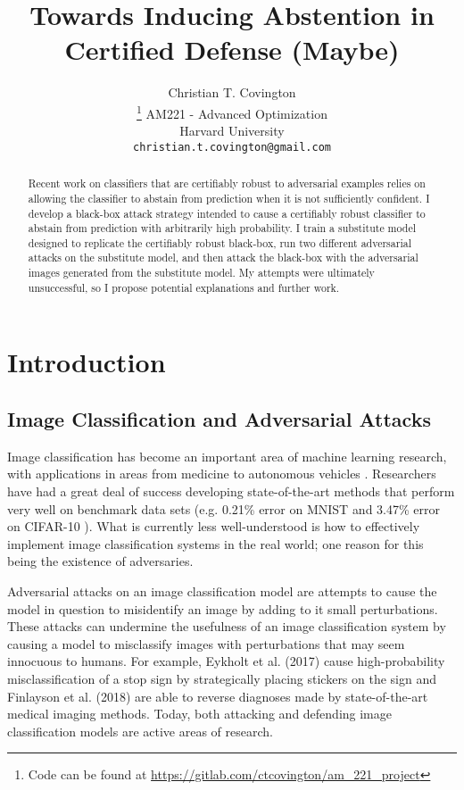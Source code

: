 \documentclass{article}
\title{Towards Inducing Abstention in Certified Defense (Maybe)}
\author{
  Christian T. Covington \\
  \thanks{Code can be found at \url{https://gitlab.com/ctcovington/am_221_project}}
  AM221 - Advanced Optimization \\
  Harvard University \\
  \texttt{christian.t.covington@gmail.com} \\
}
\begin{document}
\maketitle

\begin{abstract}
  Recent work on classifiers that are certifiably robust to adversarial examples relies on allowing the classifier to abstain from prediction when it is not sufficiently confident. I develop a black-box attack strategy intended to cause a certifiably robust classifier to abstain from prediction with arbitrarily high probability. I train a substitute model designed to replicate the certifiably robust black-box, run two different adversarial attacks on the substitute model, and then attack the black-box with the adversarial images generated from the substitute model. My attempts were ultimately unsuccessful, so I propose potential explanations and further work.
\end{abstract}

\section{Introduction}

\subsection{Image Classification and Adversarial Attacks}
Image classification has become an important area of machine learning research, with applications in areas from medicine \cite{RIZYMDDBLSPN17} to autonomous vehicles \cite{BGCACFJBPMSS19}. Researchers have had a great deal of success developing state-of-the-art methods that perform very well on benchmark data sets (e.g. 0.21\% error on MNIST \cite{WZZCF13} and 3.47\% error on CIFAR-10 \cite{G14}). What is currently less well-understood is how to effectively implement image classification systems in the real world; one reason for this being the existence of adversaries. \newline

Adversarial attacks on an image classification model are attempts to cause the model in question to misidentify an image by adding to it small perturbations. These attacks can undermine the usefulness of an image classification system by causing a model to misclassify images with perturbations that may seem innocuous to humans. For example, Eykholt et al. (2017) \cite{EEFLRXPKS17} cause high-probability misclassification of a stop sign by strategically placing stickers on the sign and Finlayson et al. (2018) \cite{FCKB18} are able to reverse diagnoses made by state-of-the-art medical imaging methods. Today, both attacking and defending image classification models are active areas of research. \newline
\end{document}
